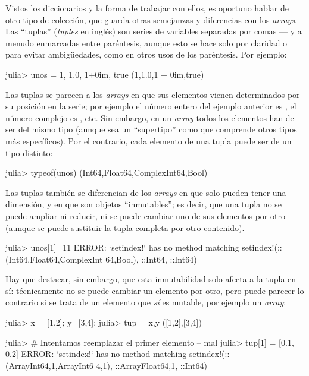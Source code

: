 {Vistos los diccionarios y la forma de trabajar con ellos, es oportuno hablar de otro tipo de colección, que guarda otras semejanzas y diferencias con los \emph{arrays}. Las ``tuplas'' (\emph{tuples} en inglés) son series de variables separadas por comas --- y a menudo enmarcadas entre paréntesis, aunque esto se hace solo por claridad o para evitar ambigüedades, como en otros usos de los paréntesis. Por ejemplo:

\begin{jlconcode}
julia> unos = 1, 1.0, 1+0im, true
(1,1.0,1 + 0im,true)
\end{jlconcode}

Las tuplas se parecen a los \emph{arrays} en que sus elementos vienen determinados por su posición en la serie; por ejemplo el número entero del ejemplo anterior es , el número complejo es , etc. Sin embargo, en un \emph{array} todos los elementos han de ser del mismo tipo (aunque sea un ``supertipo'' como  que comprende otros tipos más específicos). Por el contrario, cada elemento de una tupla puede ser de un tipo distinto: 

\begin{jlconcode}
julia> typeof(unos)
(Int64,Float64,Complex{Int64},Bool)
\end{jlconcode}

Las tuplas también se diferencian de los \emph{arrays} en que solo pueden tener una dimensión, y en que son objetos ``inmutables''; es decir, que una tupla no se puede ampliar ni reducir, ni se puede cambiar uno de sus elementos por otro (aunque se puede sustituir la tupla completa por otro contenido).

\begin{jlconcode}
julia> unos[1]=11
ERROR: `setindex!` has no method matching setindex!(::(Int64,Float64,Complex{Int
64},Bool), ::Int64, ::Int64)
\end{jlconcode}

Hay que destacar, sin embargo, que esta inmutabilidad solo afecta a la tupla en sí: técnicamente no se puede cambiar un elemento por otro, pero puede parecer lo contrario si se trata de un elemento que \emph{sí} es mutable, por ejemplo un \emph{array}:

\begin{jlconcode}
julia> x = [1,2]; y=[3,4];
julia> tup = x,y
([1,2],[3,4])

julia> # Intentamos reemplazar el primer elemento -- mal
julia> tup[1] = [0.1, 0.2]
ERROR: `setindex!` has no method matching setindex!(::(Array{Int64,1},Array{Int6
4,1}), ::Array{Float64,1}, ::Int64)


\end{jlconcode}}
